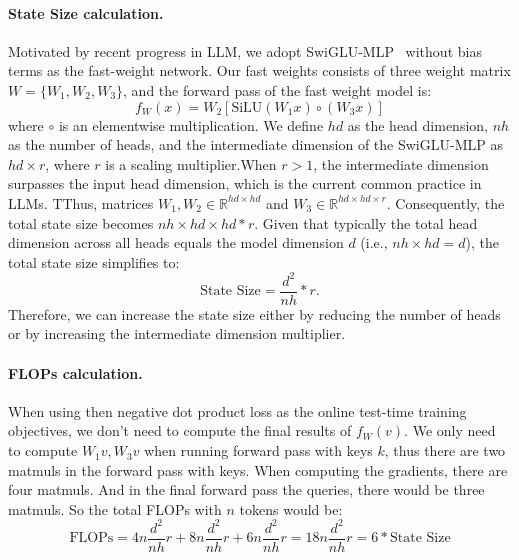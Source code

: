 \paragraph{State Size calculation.} Motivated by recent progress in LLM, we adopt SwiGLU-MLP~\cite{shazeer2020glu} without bias terms as the fast-weight 
network. 
Our fast weights consists of three weight matrix $W = \{W_1, W_2, W_3\}$, and the forward pass of the fast weight model is:
\begin{equation}
f_W(x) = W_2 \left[ \mathrm{SiLU}(W_1 x) \circ (W_3 x) \right]
\label{eq:swiglu_supp}
\end{equation}
where $\circ$ is an elementwise multiplication. We define $\mathit{hd}$ as the head dimension, $\mathit{nh}$ as the number of heads, and the intermediate dimension of the SwiGLU-MLP as $\mathit{hd} \times r$, where $r$ is a scaling multiplier.When $r > 1$, the intermediate dimension surpasses the input head dimension, which is the current common practice in LLMs.  TThus, matrices $W_1, W_2 \in \mathbb{R}^{\mathit{hd} \times \mathit{hd}}$ and $W_3 \in \mathbb{R}^{\mathit{hd} \times \mathit{hd} \times r}$. Consequently, the total state size becomes $\mathit{nh} \times \mathit{hd} \times \mathit{hd} *r$.  Given that typically the total head dimension across all heads equals the model dimension $d$ (i.e., $\mathit{nh} \times \mathit{hd} = d$), the total state size simplifies to:
\begin{equation}
    \text{State Size} = \frac{d^2}{\mathit{nh}} * r.
    \label{eq:state_size}
\end{equation}
Therefore, we can increase the state size either by reducing the number of heads or by increasing the intermediate dimension multiplier.


\paragraph{FLOPs calculation.} When using then negative dot product loss as the online test-time training objectives, we don't need to compute the final results of $f_W(v)$. We only need to compute $W_1v, W_3v$ when running forward pass with keys $k$, thus there are two matmuls in the forward pass with keys.  When computing the gradients, there are four matmuls. And in the final forward pass the queries, there would be three matmuls. So the total FLOPs with $n$ tokens would be:
\begin{equation}
    \text{FLOPs} = 4n \frac{d^2}{\mathit{nh}}r +  8n \frac{d^2}{\mathit{nh}}r +  6n \frac{d^2}{\mathit{nh}}r  = 18n \frac{d^2}{\mathit{nh}}r = 6 * \text{State Size} 
\end{equation}

